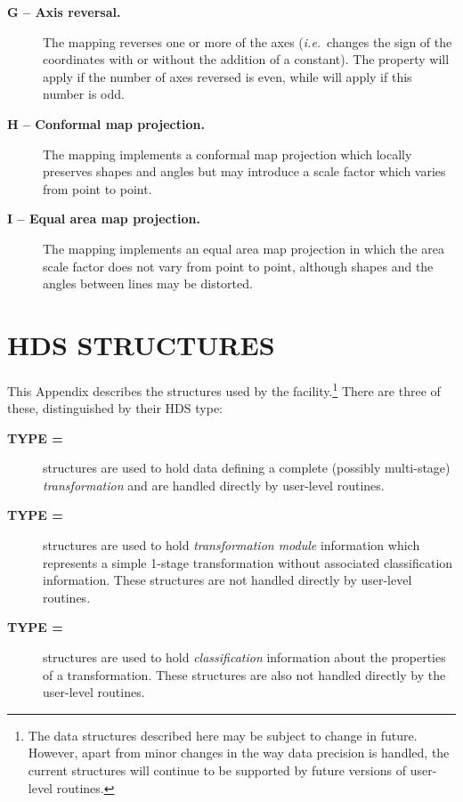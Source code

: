 \begin{description}
\item[{\bf G -- Axis reversal.}] The mapping reverses one or more of the
axes ({\em i.e.}\ changes the sign of the coordinates with or without the
addition of a constant). 
The  property will apply if the number of axes reversed
is even, while  will apply if this number is odd. 

\item[{\bf H -- Conformal map projection.}] The mapping implements a
conformal map projection which locally preserves shapes and angles but may
introduce a scale factor which varies from point to point. 

\item[{\bf I -- Equal area map projection.}] The mapping implements an
equal area map projection in which the area scale factor does not vary from
point to point, although shapes and the angles between lines may be
distorted. 

\end{description}


\newpage
\section{HDS STRUCTURES}

\label{appendix:structures}

This Appendix describes the  structures used by the
 facility.\footnote{
The data structures described here may be subject to change in future.
However, apart from minor changes in the way data precision is handled, the
current structures will continue to be supported by future versions of
user-level  routines. 
}
There are three of these, distinguished by their HDS type: 

\begin{description}

\item[{\bf TYPE = }] structures are used to hold data
defining a complete (possibly multi-stage) {\em transformation} and are
handled directly by user-level  routines. 

\item[{\bf TYPE = }] structures are used to hold {\em
transformation module} information which represents a simple 1-stage
transformation without associated classification information. 
These structures are not handled directly by user-level  
routines. 

\item[{\bf TYPE = }] structures are used to hold
{\em classification} information about the properties of a transformation. 
These structures are also not handled directly by the user-level
 routines. 

\end{description}

